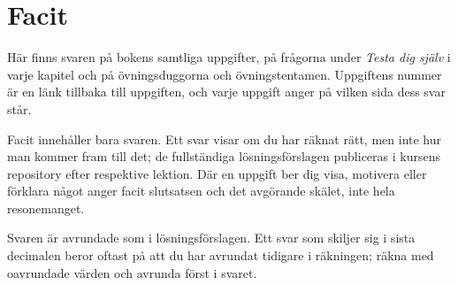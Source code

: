 
\chapter{Facit}
\label{facit:ch}

Här finns svaren på bokens samtliga uppgifter, på frågorna under \emph{Testa dig själv} i varje
kapitel och på övningsduggorna och övningstentamen. Uppgiftens nummer är en länk tillbaka till
uppgiften, och varje uppgift anger på vilken sida dess svar står.

Facit innehåller bara svaren. Ett svar visar om du har räknat rätt, men inte hur man kommer
fram till det; de fullständiga lösningsförslagen publiceras i kursens repository efter
respektive lektion. Där en uppgift ber dig visa, motivera eller förklara något anger facit
slutsatsen och det avgörande skälet, inte hela resonemanget.

Svaren är avrundade som i lösningsförslagen. Ett svar som skiljer sig i sista decimalen beror
oftast på att du har avrundat tidigare i räkningen; räkna med oavrundade värden och avrunda först
i svaret.




















